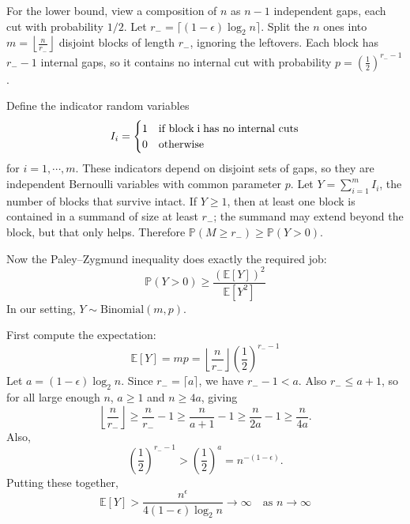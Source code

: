 
For the lower bound, view a composition of $n$ as $n - 1$ independent gaps, each cut with probability $1/2$.
Let $r_{-} = \lceil (1 - \epsilon)\log_{2}n \rceil$. Split the $n$ ones into
$m = \left\lfloor \frac{n}{r_{-}} \right\rfloor$ disjoint blocks of length $r_{-}$, ignoring the leftovers.
Each block has $r_{-} - 1$ internal gaps, so it contains no internal cut with probability
$p = \left(\frac{1}{2} \right)^{r_{-} - 1}$.

Define the indicator random variables
\begin{equation*}
    I_{i} = \begin{cases}
        1 & \text{if block} \; $i$ \; \text{has no internal cuts} \\
        0 & \text{otherwise}
    \end{cases}
\end{equation*}
for $i = 1, \cdots, m$. These indicators depend on disjoint sets of gaps, so they are
independent Bernoulli variables with common parameter $p$. Let $Y = \sum_{i = 1}^{m} I_{i}$,
the number of blocks that survive intact.
If $Y \geq 1$, then at least one block is contained in a summand of size at least $r_{-}$;
the summand may extend beyond the block, but that only helps. Therefore
$\mathbb{P}(M \geq r_{-}) \geq \mathbb{P}(Y > 0)$.

Now the Paley–Zygmund inequality does exactly the required job:
\begin{equation*}
    \mathbb{P}(Y > 0) \geq \frac{(\mathbb{E}[Y])^{2}}{\mathbb{E}[Y^{2}]}
\end{equation*}
In our setting, $Y \sim \text{Binomial}(m, p)$.

First compute the expectation:
\begin{equation*}
    \mathbb{E}[Y] = mp = \left\lfloor \frac{n}{r_{-}} \right\rfloor \left(\frac{1}{2} \right)^{r_{-} - 1}
\end{equation*}
Let $a=(1-\epsilon)\log_2 n$. Since $r_-=\lceil a\rceil$, we have $r_- -1 < a$.
Also $r_-\leq a+1$, so for all large enough $n$, $a\geq 1$ and $n\geq 4a$, giving
\begin{equation*}
    \left\lfloor \frac{n}{r_-}\right\rfloor
        \geq \frac{n}{r_-}-1
        \geq \frac{n}{a+1}-1
        \geq \frac{n}{2a}-1
        \geq \frac{n}{4a}.
\end{equation*}
Also,
\begin{equation*}
    \left(\frac{1}{2}\right)^{r_- - 1}
        > \left(\frac{1}{2}\right)^a
        = n^{-(1-\epsilon)}.
\end{equation*}
Putting these together,
\begin{equation*}
    \mathbb{E}[Y] > \frac{n^{\epsilon}}{4(1 - \epsilon)\log_{2}n} \to \infty \quad \text{as } n \to \infty
\end{equation*}

